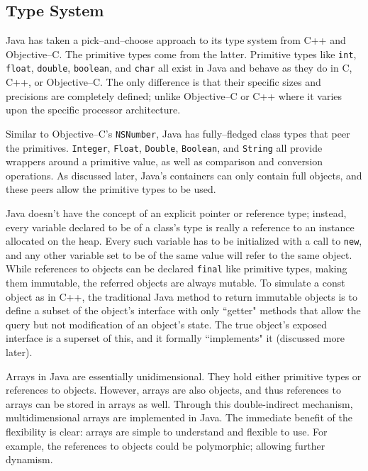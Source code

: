 
\subsection{Type System}
  Java has taken a pick--and--choose approach to its type system from C++ and Objective--C.  The primitive types come from the latter.  Primitive types like \texttt{int}, \texttt{float}, \texttt{double}, \texttt{boolean}, and \texttt{char} all exist in Java and behave as they do in C, C++, or Objective--C.  The only difference is that their specific sizes and precisions are completely defined; unlike Objective--C or C++ where it varies upon the specific processor architecture.  

  Similar to Objective--C's \texttt{NSNumber}, Java has fully--fledged class types that peer the primitives.  \texttt{Integer}, \texttt{Float}, \texttt{Double}, \texttt{Boolean}, and \texttt{String} all provide wrappers around a primitive value, as well as comparison and conversion operations.  As discussed later, Java's containers can only contain full objects, and these peers allow the primitive types to be used.  

  Java doesn't have the concept of an explicit pointer or reference type; instead, every variable declared to be of a class's type is really a reference to an instance allocated on the heap.  Every such variable has to be initialized with a call to \texttt{new}, and any other variable set to be of the same value will refer to the same object.  While references to objects can be declared \texttt{final} like primitive types, making them immutable, the referred objects are always mutable.  To simulate a const object as in C++, the traditional Java method to return immutable objects is to define a subset of the object's interface with only ``getter" methods that allow the query but not modification of an object's state.  The true object's exposed interface is a superset of this, and it formally ``implements" it (discussed more later).

  Arrays in Java are essentially unidimensional.  They hold either primitive types or references to objects.  However, arrays are also objects, and thus references to arrays can be stored in arrays as well.  Through this double-indirect mechanism, multidimensional arrays are implemented in Java.  The immediate benefit of the flexibility is clear: arrays are simple to understand and flexible to use.  For example, the references to objects could be polymorphic; allowing further dynamism.

